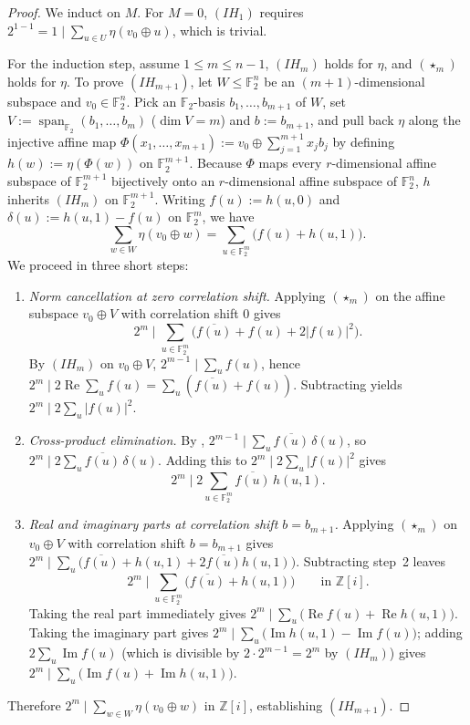 \documentclass[11pt,a4paper]{article}
\theoremstyle{plain}
\theoremstyle{definition}
\theoremstyle{remark}
\newcommand{\F}{\mathbb{F}}
\newcommand{\Zi}{\mathbb{Z}[i]}
\newcommand{\RePart}{\operatorname{Re}}
\newcommand{\ImPart}{\operatorname{Im}}
\newcommand{\spanF}{\operatorname{span}}
\newcommand{\abs}[1]{\lvert#1\rvert}
\numberwithin{equation}{section}
\begin{document}
\begin{proof}
We induct on $M$. For $M = 0$, $(IH_1)$ requires $2^{1-1} = 1 \mid \sum_{u \in U} \eta(v_0 \oplus u)$, which is trivial.

For the induction step, assume $1 \le m \le n - 1$, $(IH_m)$ holds for $\eta$, and $(\star_m)$ holds for $\eta$. To prove $(IH_{m+1})$, let $W \le \F_2^n$ be an $(m+1)$-dimensional subspace and $v_0 \in \F_2^n$. Pick an $\F_2$-basis $b_1, \dots, b_{m+1}$ of $W$, set $V := \spanF_{\F_2}(b_1, \dots, b_m)$ ($\dim V = m$) and $b := b_{m+1}$, and pull back $\eta$ along the injective affine map $\Phi(x_1, \dots, x_{m+1}) := v_0 \oplus \sum_{j=1}^{m+1} x_j b_j$ by defining $h(w) := \eta(\Phi(w))$ on $\F_2^{m+1}$. Because $\Phi$ maps every $r$-dimensional affine subspace of $\F_2^{m+1}$ bijectively onto an $r$-dimensional affine subspace of $\F_2^n$, $h$ inherits $(IH_m)$ on $\F_2^{m+1}$. Writing $f(u) := h(u, 0)$ and $\delta(u) := h(u, 1) - f(u)$ on $\F_2^m$, we have
\[
  \sum_{w \in W} \eta(v_0 \oplus w) = \sum_{u \in \F_2^m} \bigl(f(u) + h(u, 1)\bigr).
\]
We proceed in three short steps:
\begin{enumerate}[leftmargin=1.8em]
  \item \emph{Norm cancellation at zero correlation shift.} Applying $(\star_m)$ on the affine subspace $v_0 \oplus V$ with correlation shift $0$ gives
  \[
    2^m \;\Big|\; \sum_{u \in \F_2^m} \bigl(\overline{f(u)} + f(u) + 2\abs{f(u)}^2\bigr).
  \]
  By $(IH_m)$ on $v_0 \oplus V$, $2^{m-1} \mid \sum_u f(u)$, hence $2^m \mid 2\RePart\sum_u f(u) = \sum_u (\overline{f(u)} + f(u))$. Subtracting yields $2^m \mid 2\sum_u \abs{f(u)}^2$.
  \item \emph{Cross-product elimination.} By , $2^{m-1} \mid \sum_u \overline{f(u)}\,\delta(u)$, so $2^m \mid 2\sum_u \overline{f(u)}\,\delta(u)$. Adding this to $2^m \mid 2\sum_u \abs{f(u)}^2$ gives
  \[
    2^m \;\Big|\; 2 \sum_{u \in \F_2^m} \overline{f(u)}\,h(u, 1).
  \]
  \item \emph{Real and imaginary parts at correlation shift $b = b_{m+1}$.} Applying $(\star_m)$ on $v_0 \oplus V$ with correlation shift $b = b_{m+1}$ gives $2^m \mid \sum_u \bigl(\overline{f(u)} + h(u, 1) + 2\overline{f(u)}h(u, 1)\bigr)$. Subtracting step~2 leaves
  \[
    2^m \;\Big|\; \sum_{u \in \F_2^m} \bigl(\overline{f(u)} + h(u, 1)\bigr) \qquad \text{in } \Zi.
  \]
  Taking the real part immediately gives $2^m \mid \sum_u \bigl(\RePart f(u) + \RePart h(u, 1)\bigr)$. Taking the imaginary part gives $2^m \mid \sum_u \bigl(\ImPart h(u, 1) - \ImPart f(u)\bigr)$; adding $2\sum_u \ImPart f(u)$ (which is divisible by $2 \cdot 2^{m-1} = 2^m$ by $(IH_m)$) gives $2^m \mid \sum_u \bigl(\ImPart f(u) + \ImPart h(u, 1)\bigr)$.
\end{enumerate}
Therefore $2^m \mid \sum_{w \in W} \eta(v_0 \oplus w)$ in $\Zi$, establishing $(IH_{m+1})$.
\end{proof}
\end{document}
